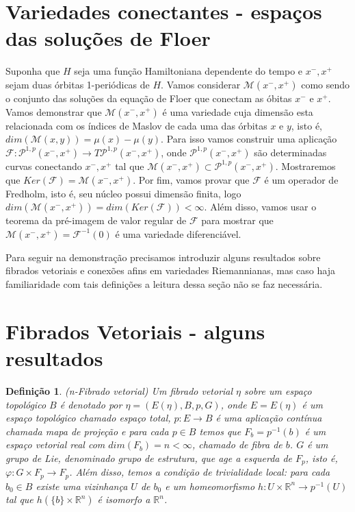 \documentclass[12pt]{book}
\newtheorem{definicao}[teorema]{Definição}
\newcommand{\caminhosexponenciaisconectantes}[2]{\mathcal{P}^{1,p}(#1, #2)}
\newcommand{\caminhosexponenciaisconectantespadrao}{\caminhosexponenciaisconectantes{x^{-}}{x^{+}}}
\newcommand{\mapafloer}{\mathcal{F}}
\newcommand{\orbitasconectantes}[2]{\mathcal{M}(#1, #2)}
\newcommand{\orbitasconectantespadrao}{\mathcal{M}(x^{-}, x^{+})}
\newcommand{\real}[1]{\mathbb{R}^{#1}}
\begin{document}
	\section{Variedades conectantes - espaços das soluções de Floer}
	Suponha que $H$ seja uma função Hamiltoniana dependente do tempo e $x^{-}, x^{+}$ sejam duas órbitas 1-periódicas de $H$. Vamos considerar $\orbitasconectantespadrao$ como sendo o conjunto das soluções da equação de Floer que conectam as óbitas $x^{-}$ e $x^{+}$. Vamos demonstrar que $\orbitasconectantespadrao$ é uma variedade cuja dimensão esta relacionada com os índices de Maslov de cada uma das órbitas $x$ e $y$, isto é, $dim(\orbitasconectantes{x}{y}) = \mu(x)-\mu(y)$. Para  isso vamos construir uma aplicação $\mapafloer: \caminhosexponenciaisconectantespadrao \to T\caminhosexponenciaisconectantespadrao$, onde $\caminhosexponenciaisconectantespadrao$ são determinadas curvas conectando $x^{-}, x^{+}$ tal que $\orbitasconectantespadrao \subset \caminhosexponenciaisconectantespadrao$. Mostraremos que $Ker(\mapafloer) = \orbitasconectantespadrao$. Por fim, vamos provar que $\mapafloer$ é um operador de Fredholm, isto é, seu núcleo possui dimensão finita, logo $dim (\orbitasconectantespadrao) = dim (Ker(\mapafloer)) < \infty$. Além disso, vamos usar o teorema da pré-imagem de valor regular de $\mapafloer$ para mostrar que $\orbitasconectantespadrao = \mapafloer^{-1}(0)$ é uma variedade diferenciável.
	
	Para seguir na demonstração precisamos introduzir alguns resultados sobre fibrados vetoriais e conexões afins em variedades Riemannianas, mas caso haja familiaridade com tais definições a leitura dessa seção não se faz necessária.
	
	\section{Fibrados Vetoriais - alguns resultados}
	\begin{definicao}
		(n-Fibrado vetorial) Um fibrado vetorial $\eta$ sobre um espaço topológico $B$ é denotado por $\eta = (E(\eta), B, p, G)$, onde $E=E(\eta)$ é um espaço topológico chamado espaço total, $p:E\to B$ é uma aplicação contínua chamada mapa de projeção e para cada $p \in B$ temos que $F_{b}=p^{-1}(b)$ é um espaço vetorial real com $dim(F_{b}) = n < \infty$, chamado de fibra de $b$. $G$ é um grupo de Lie, denominado grupo de estrutura, que age a esquerda de $F_{p}$, isto é, $\varphi:G\times F_{p} \to F_{p}$. Além disso, temos a condição de trivialidade local: para cada $b_{0} \in B$ existe uma vizinhança $U$ de $b_{0}$ e um homeomorfismo $h:U\times\real{n} \to p^{-1}(U)$ tal que $h(\{b\} \times \real{n})$ é isomorfo a $\real{n}$.
	\end{definicao}
	
\end{document}
